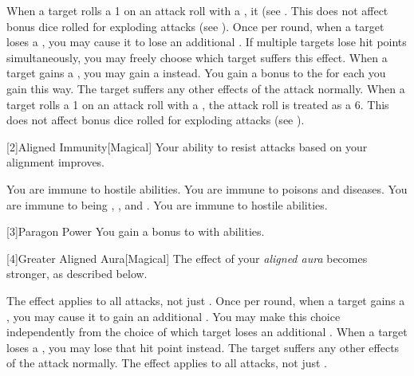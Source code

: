          When a target rolls a 1 on an attack roll with a , it  (see .
        This does not affect bonus dice rolled for exploding attacks (see ).
         Once per round, when a target loses a , you may cause it to lose an additional .
        If multiple targets lose hit points simultaneously, you may freely choose which target suffers this effect.
         When a target gains a , you may gain a  instead.
        You gain a  bonus to the  for each  you gain this way.
        The target suffers any other effects of the attack normally.
         When a target rolls a 1 on an attack roll with a , the attack roll is treated as a 6.
        This does not affect bonus dice rolled for exploding attacks (see ).

        [2]{Aligned Immunity}[Magical]
        Your ability to resist attacks based on your alignment improves.

         You are immune to hostile  abilities.
         You are immune to poisons and diseases.
         You are immune to being , , and .
         You are immune to hostile  abilities.

        [3]{Paragon Power}
        You gain a  bonus to  with  abilities.

        [4]{Greater Aligned Aura}[Magical]
        The effect of your \textit{aligned aura} becomes stronger, as described below.

         The effect applies to all attacks, not just .
         Once per round, when a target gains a , you may cause it to gain an additional .
        You may make this choice independently from the choice of which target loses an additional .
         When a target loses a , you may lose that hit point instead.
        The target suffers any other effects of the attack normally.
         The effect applies to all attacks, not just .

